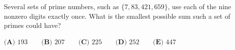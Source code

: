 Several sets of prime numbers, such as $\{7,83,421,659\}$, use each of the nine nonzero digits exactly once. What is the smallest possible sum such a set of primes could have?

$\textbf{(A) }193\qquad\textbf{(B) }207\qquad\textbf{(C) }225\qquad\textbf{(D) }252\qquad\textbf{(E) }447$
